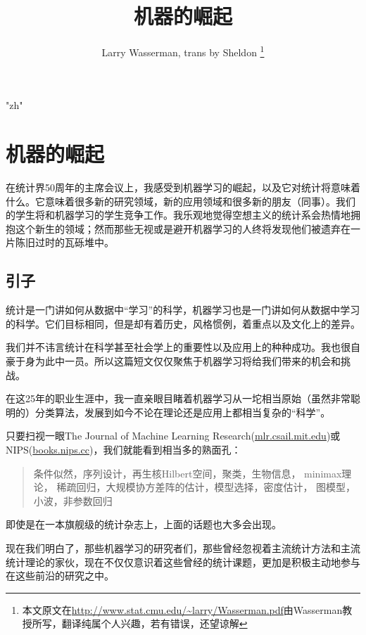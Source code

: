 \documentclass[]{article}
\begin{document}
\setmainfont{楷体}
\XeTeXlinebreaklocale "zh"
\newcommand{\EE}{ {\mathbb{E}} }
\newcommand{\RR}{ {\mathbb{R}} }
\newcommand{\PP}{ {\mathcal{P}} }
\newcommand{\UU}{ {\mathcal{U}} }
\newcommand{\LL}{ {\mathcal{L}} }

\title{机器的崛起}
\author{Larry Wasserman, trans by Sheldon \footnote{本文原文在\url{http://www.stat.cmu.edu/~larry/Wasserman.pdf}由Wasserman教授所写，翻译纯属个人兴趣，若有错误，还望谅解} }
\date{}
\maketitle

\section{机器的崛起}

在统计界50周年的主席会议上，我感受到机器学习的崛起，以及它对统计将意味着什么。它意味着很多新的研究领域，新的应用领域和很多新的朋友（同事）。我们的学生将和机器学习的学生竞争工作。我乐观地觉得空想主义的统计系会热情地拥抱这个新生的领域；然而那些无视或是避开机器学习的人终将发现他们被遗弃在一片陈旧过时的瓦砾堆中。

\subsection{引子}

统计是一门讲如何从数据中``学习''的科学，机器学习也是一门讲如何从数据中学习的科学。它们目标相同，但是却有着历史，风格惯例，着重点以及文化上的差异。

\indent 我们并不讳言统计在科学甚至社会学上的重要性以及应用上的种种成功。我也很自豪于身为此中一员。所以这篇短文仅仅聚焦于机器学习将给我们带来的机会和挑战。

\indent 在这25年的职业生涯中，我一直亲眼目睹着机器学习从一坨相当原始（虽然非常聪明的）分类算法，发展到如今不论在理论还是应用上都相当复杂的``科学''。

\indent 只要扫视一眼The Journal of Machine Learning Research(\url{mlr.csail.mit.edu})或NIPS(\url{books.nips.cc})，我们就能看到相当多的熟面孔：
\begin{quote} 
    条件似然，序列设计，再生核Hilbert空间，聚类，生物信息， minimax理论，
    稀疏回归，大规模协方差阵的估计，模型选择，密度估计， 图模型，小波，非参数回归
\end{quote}
即使是在一本旗舰级的统计杂志上，上面的话题也大多会出现。

\indent 现在我们明白了，那些机器学习的研究者们，那些曾经忽视着主流统计方法和主流统计理论的家伙，现在不仅仅意识着这些曾经的统计课题，更加是积极主动地参与在这些前沿的研究之中。
\end{document}
